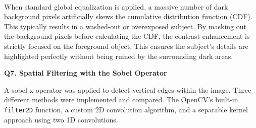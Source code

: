 \documentclass[11pt]{article}
\begin{document}
    \begin{center}
    \end{center}
    { \hspace*{\fill} \\}
    
    When standard global equalization is applied, a massive number of dark
background pixels artificially skews the cumulative distribution
function (CDF). This typically results in a washed-out or overexposed
subject. By masking out the background pixels before calculating the
CDF, the contrast enhancement is strictly focused on the foreground
object. This ensures the subject's details are highlighted perfectly
without being ruined by the surrounding dark areas.

\textbf{\Large Q7. Spatial Filtering with the Sobel Operator}

    A sobel x operator was applied to detect vertical edges within the
image. Three different methods were implemented and compared. The
OpenCV's built-in \texttt{filter2D} function, a custom 2D convolution
algorithm, and a separable kernel approach using two 1D convolutions.
\end{document}

